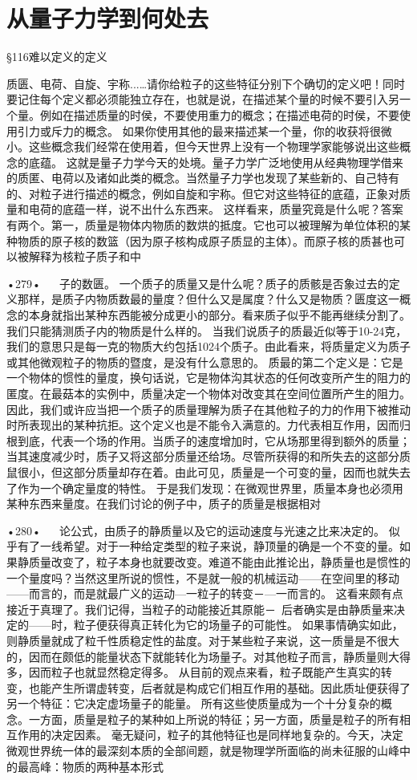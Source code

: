 \chapter{从量子力学到何处去}

§116难以定义的定义

质匮、电荷、自旋、宇称...…请你给粒子的这些特征分别下个确切的定义吧！同时要记住每个定义都必须能独立存在，也就是说，在描述某个量的时候不要引入另一个量。例如在描述质量的时侯，不要使用重力的概念；在描述电荷的时侯，不要使用引力或斥力的概念。
如果你使用其他的最来描述某一个量，你的收获将很微小。这些概念我们经常在使用着，但今天世界上没有一个物理学家能够说出这些概念的底蕴。
这就是量子力学今天的处境。量子力学广泛地使用从经典物理学借来的质匿、电荷以及诸如此类的概念。当然量子力学也发现了某些新的、自己特有的、对粒子进行描述的概念，例如自旋和宇称。但它对这些特征的底蕴，正象对质量和电荷的底蕴一样，说不出什么东西来。
这样看来，质量究竟是什么呢？答案有两个。第一，质量是物体内物质的数烘的抵度。它也可以被理解为单位体积的某种物质的原子核的数篮（因为原子核构成原子质显的主体）。而原子核的质甚也可以被解释为核粒子质子和中

•279•
  
子的数匮。
一个质子的质量又是什么呢？质子的质骸是否象过去的定义那样，是质子内物质数最的量度？但什么又是属度？什么又是物质？匮度这一概念的本身就指出某种东西能被分成更小的部分。看来质子似乎不能再继续分割了。我们只能猜测质子内的物质是什么样的。
当我们说质子的质最近似等于10-24克，我们的意思只是每一克的物质大约包括1024个质子。由此看来，将质量定义为质子或其他微观粒子的物质的暨度，是没有什么意思的。
质最的第二个定义是：它是一个物体的惯性的量度，换句话说，它是物体沟其状态的任何改变所产生的阻力的匿度。在最菇本的实例中，质量决定一个物体对改变其在空间位置所产生的阻力。
因此，我们或许应当把一个质子的质量理解为质子在其他粒子的力的作用下被推动时所表现出的某种抗拒。这个定义也是不能令入满意的。力代表相互作用，因而归根到底，代表一个场的作用。当质子的速度增加时，它从场那里得到额外的质量；当其速度减少时，质子又将这部分质量还给场。尽管所获得的和所失去的这部分质鼠很小，但这部分质量却存在着。由此可见，质量是一个可变的量，因而也就失去了作为一个确定量度的特性。
于是我们发现：在微观世界里，质量本身也必须用某种东西来量度。在我们讨论的例子中，质子的质量是根据相对

•280•
  
论公式，由质子的静质量以及它的运动速度与光速之比来决定的。
似乎有了一线希望。对于一种给定类型的粒子来说，静顶量的确是一个不变的量。如果静质量改变了，粒子本身也就要改变。难道不能由此推论出，静质量也是惯性的一个量度吗？当然这里所说的惯性，不是就一般的机械运动——在空间里的移动——而言的，而是就最广义的运动—一粒子的转变－—一而言的。
这看来颇有点接近于真理了。我们记得，当粒子的动能接近其原能－~后者确实是由静质量来决定的——时，粒子便获得真正转化为它的场量子的可能性。
如果事情确实如此，则静质量就成了粒千性质稳定性的盐度。对于某些粒子来说，这一质量是不很大的，因而在颇低的能量状态下就能转化为场量子。对其他粒子而言，静质量则大得多，因而粒子也就显然稳定得多。
从目前的观点来看，粒子既能产生真实的转变，也能产生所谓虚转变，后者就是构成它们相互作用的基础。因此质址便获得了另一个特征：它决定虚场量子的能量。
所有这些使质量成为一个十分复杂的概念。一方面，质量是粒子的某种如上所说的特征；另一方面，质量是粒子的所有相互作用的决定因素。
毫无疑问，粒子的其他特征也是同样地复杂的。今天，决定微观世界统一体的最深刻本质的全部间题，就是物理学所面临的尚未征服的山峰中的最高峰：物质的两种基本形式

